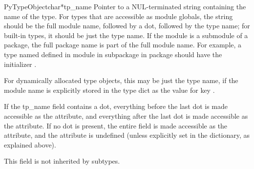 \begin{cmemberdesc}{PyTypeObject}{char*}{tp_name}
  Pointer to a NUL-terminated string containing the name of the type.
  For types that are accessible as module globals, the string should
  be the full module name, followed by a dot, followed by the type
  name; for built-in types, it should be just the type name.  If the
  module is a submodule of a package, the full package name is part of
  the full module name.  For example, a type named  defined
  in module  in subpackage  in package 
  should have the  initializer .

  For dynamically allocated type objects, this may be just the type
  name, if the module name is explicitly stored in the type dict as
  the value for key .

  If the tp_name field contains a dot, everything before the last dot
  is made accessible as the  attribute, and
  everything after the last dot is made accessible as the
   attribute.  If no dot is present, the entire
   field is made accessible as the 
  attribute, and the  attribute is undefined
  (unless explicitly set in the dictionary, as explained above).

  This field is not inherited by subtypes.
\end{cmemberdesc}

